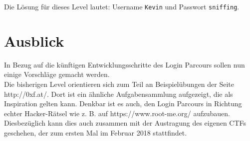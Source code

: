 Die Lösung für dieses Level lautet: Username \colorbox{altgray}{\lstinline|Kevin|} und Passwort \colorbox{altgray}{\lstinline|sniffing|}.

\section{Ausblick}
In Bezug auf die künftigen Entwicklungsschritte des Login Parcours sollen nun einige Vorschläge gemacht werden. \\ 
Die bisherigen Level orientieren sich zum Teil an Beispielübungen der Seite http://0xf.at/. Dort ist ein ähnliche Aufgabensammlung aufgezeigt, die als Inspiration gelten kann. Denkbar ist es auch, den Login Parcours in Richtung echter Hacker-Rätsel wie z. B. auf https://www.root-me.org/ aufzubauen. Diesbezüglich kann dies auch zusammen mit der Austragung des eigenen CTFs geschehen, der zum ersten Mal im Februar 2018 stattfindet.